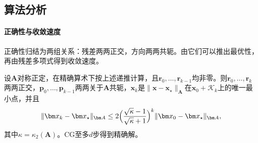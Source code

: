 \subsection{算法分析}

\paragraph{正确性与收敛速度}
正确性归结为两组关系：残差两两正交，方向两两共轭。由它们可以推出最优性，再由残差多项式得到收敛速度。

\begin{theorem}[CG的最优性与收敛速度]
\label{thm:ls-cg-convergence}
设$\bm A$对称正定，在精确算术下按上述递推计算，且$\bm r_0,\ldots,\bm r_{k-1}$均非零。则$\bm r_0,\ldots,\bm r_k$两两正交，$\bm p_0,\ldots,\bm p_{k-1}$两两关于$\bm A$共轭，$\bm x_k$是$\lVert\bm x-\bm x_\star\rVert_{\bm A}$在$\bm x_0+\mathcal K_k$上的唯一最小点，并且
\[
 \lVert\bm x_k-\bm x_\star\rVert_{\bm A}\le2\Bigl(\frac{\sqrt\kappa-1}{\sqrt\kappa+1}\Bigr)^k\lVert\bm x_0-\bm x_\star\rVert_{\bm A},
\]
其中$\kappa=\kappa_2(\bm A)$。CG至多$d$步得到精确解。
\end{theorem}

